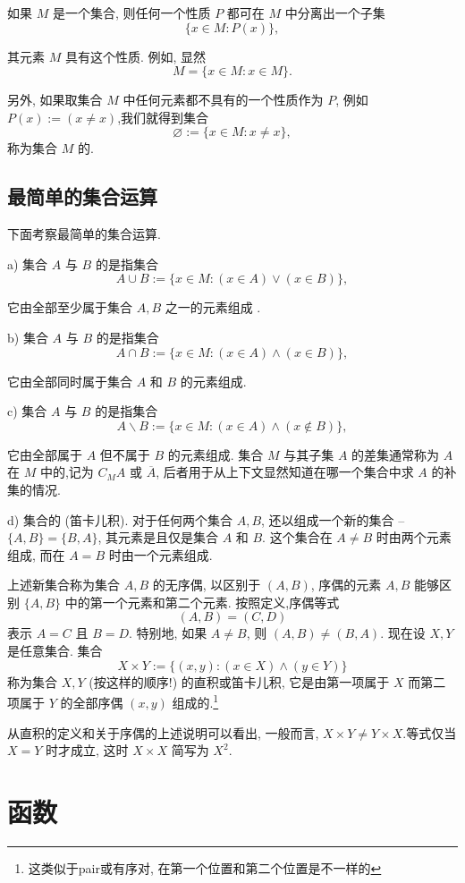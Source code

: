 \documentclass{ctexart}
\begin{document}
如果 $M$ 是一个集合, 则任何一个性质 $P$ 都可在 $M$ 中分离出一个子集
$$
\{x \in M : P(x)\},
$$

其元素 $M$ 具有这个性质.
例如, 显然
$$
M=\{x \in M : x \in M\} .
$$

另外, 如果取集合 $M$ 中任何元素都不具有的一个性质作为 $P$, 例如 $P(x):=(x \neq x)$,我们就得到集合
$$
\varnothing:=\{x \in M : x \neq x\},
$$
称为集合 $M$ 的.

\subsection{最简单的集合运算} 下面考察最简单的集合运算.

a) 集合 $A$ 与 $B$ 的是指集合
$$
A \cup B:=\{x \in M :(x \in A) \vee(x \in B)\},
$$

它由全部至少属于集合 $A, B$ 之一的元素组成 .

b) 集合 $A$ 与 $B$ 的是指集合
$$
A \cap B:=\{x \in M :(x \in A) \wedge(x \in B)\},
$$

它由全部同时属于集合 $A$ 和 $B$ 的元素组成.

c) 集合 $A$ 与 $B$ 的是指集合
$$
A \backslash B:=\{x \in M :(x \in A) \wedge(x \notin B)\},
$$

它由全部属于 $A$ 但不属于 $B$ 的元素组成.
集合 $M$ 与其子集 $A$ 的差集通常称为 $A$ 在 $M$ 中的,记为 $C_M A$ 或 $\overline{A}$, 后者用于从上下文显然知道在哪一个集合中求 $A$ 的补集的情况.

d) 集合的 (笛卡儿积). 对于任何两个集合 $A, B$, 还以组成一个新的集合 -- $\{A, B\}=\{B, A\}$, 其元素是且仅是集合 $A$ 和 $B$. 这个集合在 $A \neq B$ 时由两个元素组成, 而在 $A=B$ 时由一个元素组成.

上述新集合称为集合 $A, B$ 的无序偶, 以区别于 $(A, B)$, 序偶的元素 $A, B$ 能够区别 $\{A, B\}$ 中的第一个元素和第二个元素. 按照定义,序偶等式
$$ 
(A, B)=(C, D)
$$
表示 $A=C$ 且 $B=D$. 特别地, 如果 $A \neq B$, 则 $(A, B) \neq(B, A)$.
现在设 $X, Y$ 是任意集合. 集合
$$
X \times Y:=\{(x, y) : (x \in X) \wedge(y \in Y)\}
$$
称为集合 $X, Y$ (按这样的顺序!) 的直积或笛卡儿积, 它是由第一项属于 $X$ 而第二项属于 $Y$ 的全部序偶 $(x, y)$ 组成的.\footnote{这类似于pair或有序对, 在第一个位置和第二个位置是不一样的}

从直积的定义和关于序偶的上述说明可以看出, 一般而言, $X \times Y \neq Y \times X$.等式仅当 $X=Y$ 时才成立, 这时 $X \times X$ 简写为 $X^2$.


\section{函数} 
\end{document}
